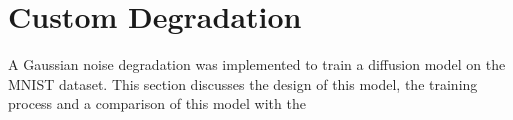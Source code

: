 
\section{Custom Degradation}\label{sec:q2}
A Gaussian noise degradation was implemented to train a diffusion model on the MNIST dataset.
This section discusses the design of this model, the training process and a comparison of this model with the
